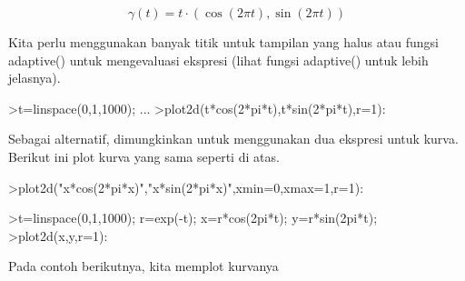 \documentclass[a4paper,10pt]{article}
\begin{document}
\begin{eulernotebook}
\begin{eulercomment}
\begin{eulercomment}
\begin{eulercomment}
\begin{eulercomment}
\begin{eulercomment}
\begin{eulercomment}
\begin{eulercomment}
\begin{eulercomment}
\begin{eulercomment}
\begin{eulercomment}
\begin{eulercomment}
\begin{eulercomment}
\begin{eulercomment}
\begin{eulercomment}
\begin{eulercomment}
\begin{eulercomment}
\begin{eulercomment}
\begin{eulercomment}
\begin{eulercomment}
\begin{eulercomment}
\begin{eulercomment}
\begin{eulercomment}
\begin{eulercomment}
\begin{eulercomment}
\begin{eulercomment}
\begin{eulercomment}
\begin{eulercomment}
\begin{eulercomment}
\begin{eulercomment}
\begin{eulercomment}
\begin{eulercomment}
\begin{eulercomment}
\begin{eulercomment}
\begin{eulercomment}
\begin{eulercomment}
\begin{eulercomment}
\begin{eulercomment}
\end{eulercomment}
\begin{eulerformula}
\[
\gamma(t) = t \cdot (\cos(2\pi t),\sin(2\pi t))
\]
\end{eulerformula}
\begin{eulercomment}
Kita perlu menggunakan banyak titik untuk tampilan yang halus atau
fungsi adaptive() untuk mengevaluasi ekspresi (lihat fungsi adaptive()
untuk lebih jelasnya).
\end{eulercomment}
\begin{eulerprompt}
>t=linspace(0,1,1000); ...
>plot2d(t*cos(2*pi*t),t*sin(2*pi*t),r=1):
\end{eulerprompt}
\begin{eulercomment}
Sebagai alternatif, dimungkinkan untuk menggunakan dua ekspresi untuk
kurva. Berikut ini plot kurva yang sama seperti di atas.
\end{eulercomment}
\begin{eulerprompt}
>plot2d("x*cos(2*pi*x)","x*sin(2*pi*x)",xmin=0,xmax=1,r=1):
\end{eulerprompt}
\begin{eulerprompt}
>t=linspace(0,1,1000); r=exp(-t); x=r*cos(2pi*t); y=r*sin(2pi*t);
>plot2d(x,y,r=1):
\end{eulerprompt}
\begin{eulercomment}
Pada contoh berikutnya, kita memplot kurvanya


\end{eulercomment}
\end{eulercomment}
\end{eulercomment}
\end{eulercomment}
\end{eulercomment}
\end{eulercomment}
\end{eulercomment}
\end{eulercomment}
\end{eulercomment}
\end{eulercomment}
\end{eulercomment}
\end{eulercomment}
\end{eulercomment}
\end{eulercomment}
\end{eulercomment}
\end{eulercomment}
\end{eulercomment}
\end{eulercomment}
\end{eulercomment}
\end{eulercomment}
\end{eulercomment}
\end{eulercomment}
\end{eulercomment}
\end{eulercomment}
\end{eulercomment}
\end{eulercomment}
\end{eulercomment}
\end{eulercomment}
\end{eulercomment}
\end{eulercomment}
\end{eulercomment}
\end{eulercomment}
\end{eulercomment}
\end{eulercomment}
\end{eulercomment}
\end{eulercomment}
\end{eulercomment}
\end{eulernotebook}
\end{document}

